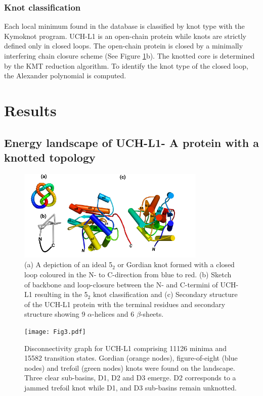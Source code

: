 \documentclass[journal=jacsat]{achemso}
\begin{document}
\subsubsection{Knot classification}
Each local minimum found in the database is classified by knot type with the Kymoknot program\cite{Tubiana18a}. UCH-L1 is an open-chain protein while knots are strictly defined only in closed loops. The open-chain protein is closed by a minimally interfering chain closure scheme \cite{Tubiana18a} (See Figure \ref{fig:fig2}b). The knotted core is determined by the KMT reduction algorithm\cite{Koniaris91a}. To identify the knot type of the closed loop, the Alexander polynomial is computed. 

\section{Results}
\subsection{Energy landscape of UCH-L1- A protein with a knotted topology}

\begin{figure}
    \centering
    \includegraphics[width=0.8\textwidth]{Fig2.pdf}
    \caption{ (a) A depiction of an ideal 5$_2$ or Gordian knot formed with a closed loop coloured in the N- to C-direction from blue to red. (b) Sketch of backbone and loop-closure between the N- and C-termini of UCH-L1 resulting in the 5$_2$ knot classification and (c) Secondary structure of the UCH-L1 protein with the terminal residues and secondary structure showing 9 $\alpha$-helices and 6 $\beta$-sheets.\label{fig:fig2}}
\end{figure}

\begin{figure}
    \centering
    \texttt{[image: Fig3.pdf]}
    \caption{Disconnectivity graph for UCH-L1 comprising 11126 minima and 15582 transition states. Gordian (orange nodes), figure-of-eight (blue nodes) and trefoil (green nodes) knots were found on the landscape. Three clear sub-basins, D1, D2 and D3 emerge. D2 corresponds to a jammed trefoil knot while D1, and D3 sub-basins remain unknotted.\label{fig:fig3}}
\end{figure}
\end{document}
